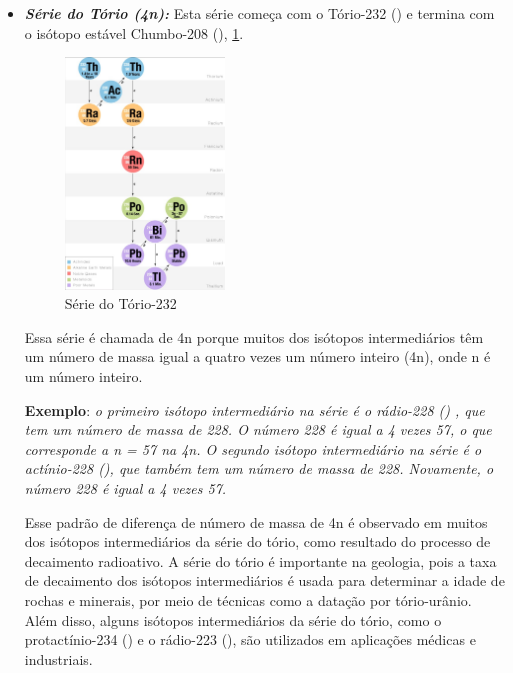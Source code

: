 \documentclass[11pt,a4paper]{article}
\begin{document}
	\begin{itemize}
		\item \textbf{\textit{\textcolor{CarnationPink}{Série do Tório (4n):}}} Esta série começa com o Tório-232 () e termina com o isótopo estável Chumbo-208 (), \ref{fig:serieDoTorio}.

		\begin{figure}[h]
			\centering
			\includegraphics[width=0.4\textwidth]{Imagens/serieDoTorio.jpg}
			\caption{Série do Tório-232}
			\label{fig:serieDoTorio}
		\end{figure}
                

    Essa série é chamada de 4n porque muitos dos isótopos intermediários têm um número de massa igual a quatro vezes um número inteiro (4n), onde n é um número inteiro.

    \textbf{Exemplo}: \textit{o primeiro isótopo intermediário na série é o rádio-228 () , que tem um número de massa de 228. O número 228 é igual a 4 vezes 57, o que corresponde a n = 57 na  4n. O segundo isótopo intermediário na série é o actínio-228 (), que também tem um número de massa de 228. Novamente, o número 228 é igual a 4 vezes 57.}

    Esse padrão de diferença de número de massa de 4n é observado em muitos dos isótopos intermediários da série do tório, como resultado do processo de decaimento radioativo. A série do tório é importante na geologia, pois a taxa de decaimento dos isótopos intermediários é usada para determinar a idade de rochas e minerais, por meio de técnicas como a datação por tório-urânio. Além disso, alguns isótopos intermediários da série do tório, como o protactínio-234 () e o rádio-223 (), são utilizados em aplicações médicas e industriais.


\end{itemize}
\end{document}
